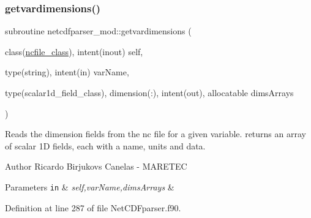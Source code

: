 \subsubsection{\texorpdfstring{getvardimensions()}{getvardimensions()}}
{\footnotesize\ttfamily subroutine netcdfparser\+\_\+mod\+::getvardimensions (\begin{DoxyParamCaption}\item[{class(\mbox{\hyperlink{structnetcdfparser__mod_1_1ncfile__class}{ncfile\+\_\+class}}), intent(inout)}]{self,  }\item[{type(string), intent(in)}]{var\+Name,  }\item[{type(scalar1d\+\_\+field\+\_\+class), dimension(\+:), intent(out), allocatable}]{dims\+Arrays }\end{DoxyParamCaption})\hspace{0.3cm}{\ttfamily [private]}}



Reads the dimension fields from the nc file for a given variable. returns an array of scalar 1D fields, each with a name, units and data. 

\begin{DoxyAuthor}{Author}
Ricardo Birjukovs Canelas -\/ M\+A\+R\+E\+T\+EC 
\end{DoxyAuthor}

\begin{DoxyParams}[1]{Parameters}
\mbox{\tt in}  & {\em self,var\+Name,dims\+Arrays} & \\
\hline
\end{DoxyParams}


Definition at line 287 of file Net\+C\+D\+Fparser.\+f90.


